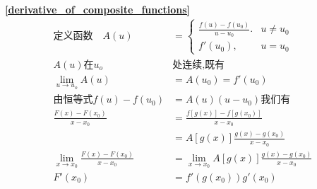 \textbf{\large \ref{derivative_of_composite_functions}}
\begin{displaymath}
    \begin{split}
        \mbox{定义函数}\quad A(u)&=\begin{cases}
            \frac{f(u)-f(u_0)}{u-u_0}. &u\neq u_0\\
            f'(u_0),&u= u_0
        \end{cases}\\
        A(u)\mbox{在}u_o&\mbox{处连续,既有}\\
        \lim\limits_{u\to u_o}A(u)&=A(u_0)=f'(u_0)\\
        \mbox{由恒等式}f(u)-f(u_0)&=A(u)(u-u_0)\mbox{我们有}\\
        \frac{F(x)-F(x_0)}{x-x_0}&=\frac{f\left[g(x)\right]-f\left[g(x_0)\right]}{x-x_0}\\
        &=A\left[g(x)\right]\frac{g(x)-g(x_0)}{x-x_0}\\
        \lim\limits_{x\to x_0}\frac{F(x)-F(x_0)}{x-x_0}&=\lim\limits_{x\to x_0}A\left[g(x)\right]\frac{g(x)-g(x_0)}{x-x_0}\\
        F'(x_0)&=f'(g(x_0))g'(x_0)
    \end{split}
\end{displaymath}

